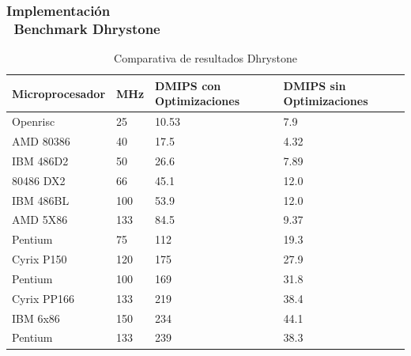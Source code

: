 \documentclass[xcolor=dvipsnames,mathserif,9pt]{beamer}
\begin{document}
\begin{frame} \frametitle{Implementación\\ \ Benchmark Dhrystone}
\begin{table}[h!]
\begin{center}
\begin{tabular}{ |l |l |l |l |}
\hline
\rowcolor[gray]{0.8} Microprocesador& MHz & DMIPS con Optimizaciones & DMIPS sin Optimizaciones \\
\hline
Openrisc		  &25	&10.53	&7.9\\
\hline
AMD 80386         &40   &17.5   &4.32\\
\hline
IBM 486D2         &50   &26.6   &7.89\\
\hline
80486 DX2         &66   &45.1   &12.0\\
\hline
IBM 486BL        &100   &53.9   &12.0\\
\hline
AMD 5X86         &133   &84.5   &9.37\\
\hline
Pentium           &75    &112   &19.3\\
\hline
Cyrix P150       &120    &175   &27.9\\
\hline
Pentium          &100    &169   &31.8\\
\hline
Cyrix PP166      &133    &219   &38.4\\
\hline
IBM 6x86         &150    &234   &44.1\\
\hline
Pentium          &133    &239   &38.3\\
\hline
\end{tabular}
\end{center}
\label{tab:conbench}
\caption{Comparativa de resultados Dhrystone}
\end{table}

\end{frame}
%    
\end{document}
